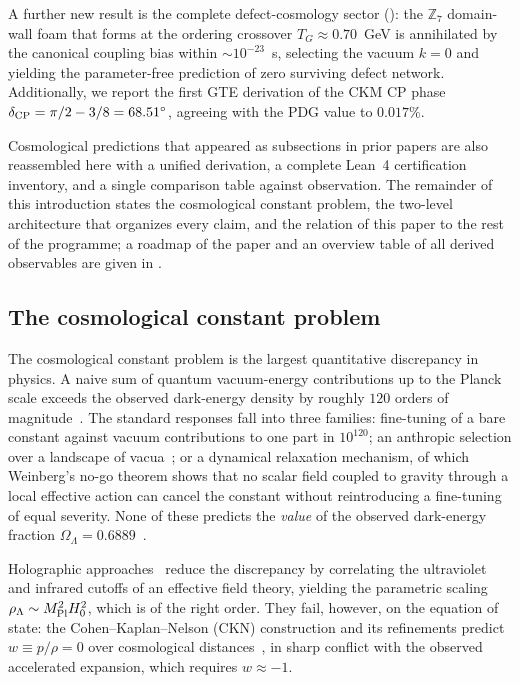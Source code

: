 \documentclass[11pt]{article}
\theoremstyle{remark}
\newcommand{\ZS}{\mathbb{Z}_7}
\newcommand{\MPl}{M_{\rm Pl}}
\newcommand{\Hnought}{H_0}
\newcommand{\OmL}{\Omega_\Lambda}
\begin{document}
A further new result is the complete defect-cosmology sector
(): the $\ZS$ domain-wall foam that forms at the ordering
crossover $T_G \approx 0.70$~GeV is annihilated by the canonical coupling bias
within $\sim\!10^{-23}$~s, selecting the vacuum $k = 0$ and yielding the
parameter-free prediction of zero surviving defect network.
Additionally, we report the first GTE derivation of the CKM CP phase
$\delta_{\rm CP} = \pi/2 - 3/8 = 68.51^\circ$, agreeing with the PDG value
to $0.017\%$.

Cosmological predictions that appeared as subsections in prior papers are also
reassembled here with a unified derivation, a complete Lean~4 certification
inventory, and a single comparison table against observation.
The remainder of this introduction states the cosmological constant problem,
the two-level architecture that organizes every claim, and the relation of
this paper to the rest of the programme; a roadmap of the paper and an
overview table of all derived observables are given in .

\subsection{The cosmological constant problem}

The cosmological constant problem is the largest quantitative discrepancy in
physics. A naive sum of quantum vacuum-energy contributions up to the Planck
scale exceeds the observed dark-energy density by roughly $120$ orders of
magnitude~\cite{Weinberg1989}. The standard responses fall into three families:
fine-tuning of a bare constant against vacuum contributions to one part in
$10^{120}$; an anthropic selection over a landscape of vacua~\cite{Weinberg1987};
or a dynamical relaxation mechanism, of which Weinberg's no-go theorem shows that
no scalar field coupled to gravity through a local effective action can cancel the
constant without reintroducing a fine-tuning of equal severity. None of these
predicts the \emph{value} of the observed dark-energy fraction
$\OmL = 0.6889$~\cite{Planck2018}.

Holographic approaches~\cite{CohenKaplanNelson1999,Hsu2004} reduce the discrepancy
by correlating the ultraviolet and infrared cutoffs of an effective field theory,
yielding the parametric scaling $\rho_\Lambda \sim \MPl^2\Hnought^2$, which is of
the right order. They fail, however, on the equation of state: the
Cohen--Kaplan--Nelson (CKN) construction and its refinements predict
$w \equiv p/\rho = 0$ over cosmological distances~\cite{Hsu2004}, in sharp conflict
with the observed accelerated expansion, which requires $w \approx -1$.
\end{document}
